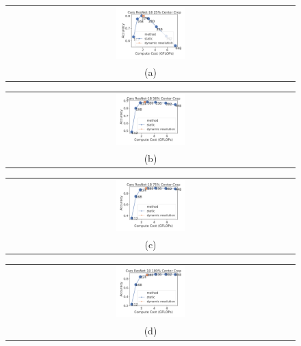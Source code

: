 \begin{figure}[t]
    \centering
    \begin{tabular}{@{}c@{}}
    \includegraphics[width=0.245\textwidth]{e2e_figures/cars_resnet18_25_center.pdf} \\
    \small (a)
    \end{tabular}
    \begin{tabular}{@{}c@{}}
    \includegraphics[width=0.245\textwidth]{e2e_figures/cars_resnet18_56_center.pdf} \\
    \small (b)
    \end{tabular}
    \begin{tabular}{@{}c@{}}
    \includegraphics[width=0.245\textwidth]{e2e_figures/cars_resnet18_default_center.pdf} \\
    \small (c)
    \end{tabular}
    \begin{tabular}{@{}c@{}}
    \includegraphics[width=0.245\textwidth]{e2e_figures/cars_resnet18_full_center.pdf} \\
    \small (d)
    \end{tabular}
    \begin{tabular}{@{}c@{}}

\end{tabular}
\end{figure}
